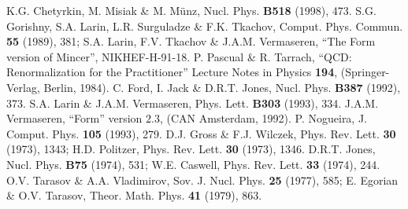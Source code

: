 \documentclass[a4paper,11pt]{article}
\begin{document}
\begin{thebibliography}{99}
 K.G. Chetyrkin, M. Misiak \& M. M\"{u}nz, Nucl. Phys. {\bf B518} 
(1998), 473.
 S.G. Gorishny, S.A. Larin, L.R. Surguladze \& F.K. Tkachov, 
Comput. Phys. Commun. {\bf 55} (1989), 381;  
S.A. Larin, F.V. Tkachov \& J.A.M. Vermaseren, ``The Form version of Mincer'', 
NIKHEF-H-91-18.
 P. Pascual \& R. Tarrach, ``QCD: Renormalization for the 
Practitioner'' Lecture Notes in Physics {\bf 194}, (Springer-Verlag, Berlin, 
1984). 
 C. Ford, I. Jack \& D.R.T. Jones, Nucl. Phys. {\bf B387} (1992),
373. 
 S.A. Larin \& J.A.M. Vermaseren, Phys. Lett. {\bf B303} (1993), 
334. 
 J.A.M. Vermaseren, ``{\sc Form}'' version $2.3$, (CAN
Amsterdam, 1992).  
 P. Nogueira, J. Comput. Phys. {\bf 105} (1993), 279. 
 D.J. Gross \& F.J. Wilczek, Phys. Rev. Lett. {\bf 30}
(1973), 1343; 
H.D. Politzer, Phys. Rev. Lett. {\bf 30} (1973), 1346.
 D.R.T. Jones, Nucl. Phys. {\bf B75} (1974), 531; 
W.E. Caswell, Phys. Rev. Lett. {\bf 33} (1974), 244. 
 O.V. Tarasov \& A.A. Vladimirov, Sov. J. Nucl. Phys. {\bf 25} 
(1977), 585;  
E. Egorian \& O.V. Tarasov, Theor. Math. Phys. {\bf 41} (1979),
863. 
\end{thebibliography}
\end{document}
